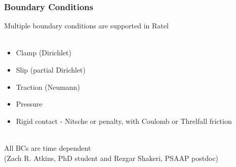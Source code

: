 \documentclass{beamer}
\begin{document}
\begin{frame}
\begin{center}
\frametitle{Boundary Conditions}

Multiple boundary conditions are supported in Ratel\\

~\\

\begin{itemize}

\item Clamp (Dirichlet)\\

\item Slip (partial Dirichlet)\\

\item Traction (Neumann)\\

\item Pressure\\

\item Rigid contact - Nitsche or penalty, with Coulomb or Threlfall friction\\

\end{itemize}

~\\

All BCs are time dependent\\


(Zach R. Atkins, PhD student and Rezgar Shakeri, PSAAP postdoc)

\end{center}
\end{frame}

\end{document}
